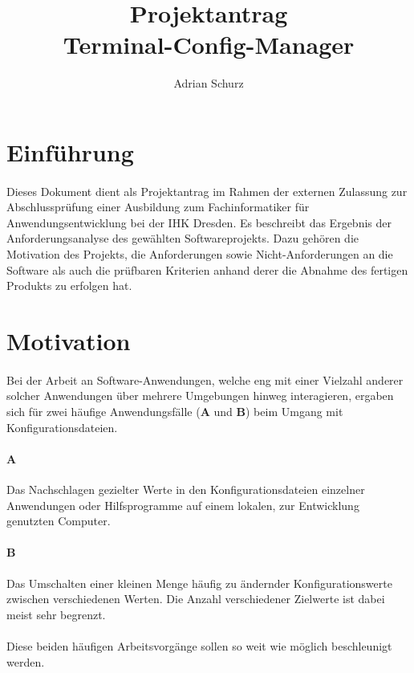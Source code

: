 \documentclass[a4paper,11pt]{article}
\author{Adrian Schurz}
\title{Projektantrag\\[0.2em]\smaller{}Terminal-Config-Manager}
\begin{document}
\maketitle
{}
\newpage
{}
\tableofcontents

\section{Einführung}
\paragraph{}
Dieses Dokument dient als Projektantrag im Rahmen der externen Zulassung
zur Abschlussprüfung einer Ausbildung zum Fachinformatiker für
Anwendungsentwicklung bei der IHK Dresden. Es beschreibt das Ergebnis der
Anforderungsanalyse des gewählten Softwareprojekts. Dazu gehören die
Motivation des Projekts, die Anforderungen sowie Nicht-Anforderungen an
die Software als auch die prüfbaren Kriterien anhand derer die Abnahme des
fertigen Produkts zu erfolgen hat.

\section{Motivation}
\paragraph{}
Bei der Arbeit an Software-Anwendungen, welche eng mit einer Vielzahl anderer
solcher Anwendungen über mehrere Umgebungen hinweg interagieren, ergaben sich
für zwei häufige Anwendungsfälle (\textbf{A} und \textbf{B}) beim Umgang mit
Konfigurationsdateien.
\paragraph{A}
Das Nachschlagen gezielter Werte in den Konfigurationsdateien
einzelner Anwendungen oder Hilfsprogramme auf einem lokalen, zur Entwicklung
genutzten Computer.
\paragraph{B}
Das Umschalten einer kleinen Menge häufig zu ändernder Konfigurationswerte
zwischen verschiedenen Werten. Die Anzahl verschiedener Zielwerte ist dabei
meist sehr begrenzt.
\paragraph{}
Diese beiden häufigen Arbeitsvorgänge sollen so weit wie möglich beschleunigt
werden.
\end{document}
